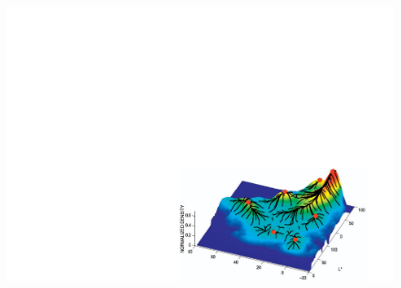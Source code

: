 \begin{frame}
\begin{columns}
			\begin{figure}[!htbp]
				\centering
				\includegraphics[width=1.0\linewidth]{images/unsupervised/non_parametric/density_level_curve.pdf}
			\end{figure}

		\end{columns}


\end{frame}


